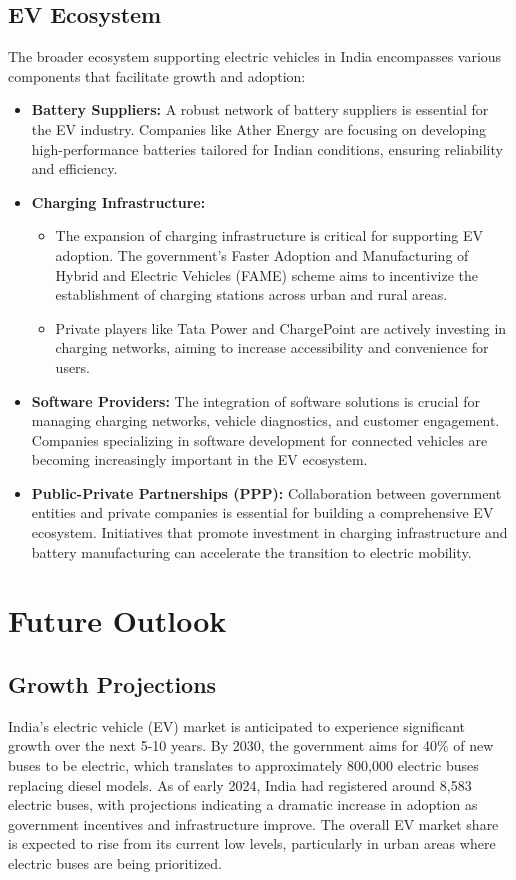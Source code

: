 \documentclass[a4paper,12pt]{report}
\begin{document}
\section{EV Ecosystem}
The broader ecosystem supporting electric vehicles in India encompasses various components that facilitate growth and adoption:
\begin{itemize}
    \item \textbf{Battery Suppliers: }
    A robust network of battery suppliers is essential for the EV industry. Companies like Ather Energy are focusing on developing high-performance batteries tailored for Indian conditions, ensuring reliability and efficiency.
    \item \textbf{Charging Infrastructure: }
    \begin{itemize}
        \item The expansion of charging infrastructure is critical for supporting EV adoption. The government’s Faster Adoption and Manufacturing of Hybrid and Electric Vehicles (FAME) scheme aims to incentivize the establishment of charging stations across urban and rural areas.
        \item Private players like Tata Power and ChargePoint are actively investing in charging networks, aiming to increase accessibility and convenience for users.
    \end{itemize}
    \item \textbf{Software Providers: }
    The integration of software solutions is crucial for managing charging networks, vehicle diagnostics, and customer engagement. Companies specializing in software development for connected vehicles are becoming increasingly important in the EV ecosystem.
    \item \textbf{Public-Private Partnerships (PPP): }
    Collaboration between government entities and private companies is essential for building a comprehensive EV ecosystem. Initiatives that promote investment in charging infrastructure and battery manufacturing can accelerate the transition to electric mobility.

\end{itemize}

\chapter{Future Outlook}
\section{Growth Projections}
India's electric vehicle (EV) market is anticipated to experience significant growth over the next 5-10 years. By 2030, the government aims for 40\% of new buses to be electric, which translates to approximately 800,000 electric buses replacing diesel models. As of early 2024, India had registered around 8,583 electric buses, with projections indicating a dramatic increase in adoption as government incentives and infrastructure improve. The overall EV market share is expected to rise from its current low levels, particularly in urban areas where electric buses are being prioritized.\cite{changingTransport}
\end{document}
